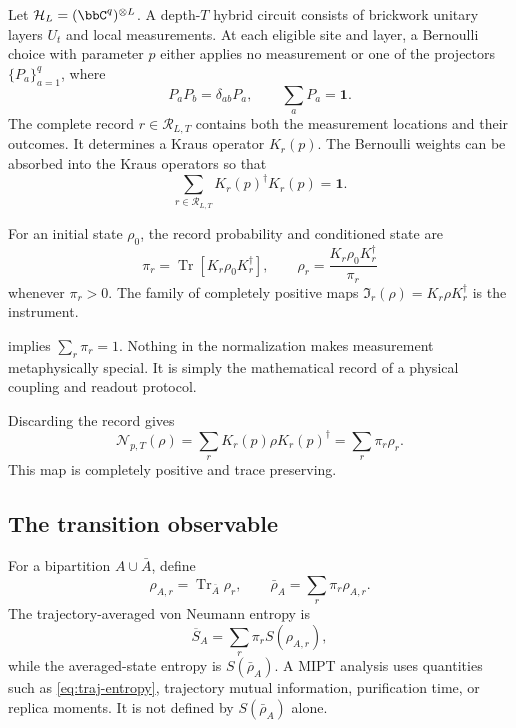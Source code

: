 \documentclass[11pt]{article}
\DeclareMathOperator{\Tr}{Tr}
\newcommand{\Inst}{\mathfrak I}
\newcommand{\Chan}{\mathcal N}
\newcommand{\Rec}{\mathcal R}
\newcommand{\Hilb}{\mathcal H}
\newcommand{\id}{\mathbf 1}
\begin{document}
Let $\Hilb_L=(\bbC^q)^{\otimes L}$.  A depth-$T$ hybrid
circuit consists of brickwork unitary layers $U_t$ and local
measurements.  At each eligible site and layer, a Bernoulli choice with
parameter $p$ either applies no measurement or one of the projectors
$\{P_a\}_{a=1}^q$, where
\[
 P_aP_b=\delta_{ab}P_a,\qquad \sum_aP_a=\id .
\]
The complete record $r\in\Rec_{L,T}$ contains both the measurement
locations and their outcomes.  It determines a Kraus operator $K_r(p)$.
The Bernoulli weights can be absorbed into the Kraus operators so that
\begin{equation}\label{eq:complete}
 \sum_{r\in\Rec_{L,T}}K_r(p)^\dagger K_r(p)=\id .
\end{equation}

\begin{definition}\label{def:instrument}
For an initial state $\rho_0$, the record probability and conditioned
state are
\begin{equation}\label{eq:trajectory}
 \pi_r=\Tr[K_r\rho_0K_r^\dagger],\qquad
 \rho_r=\frac{K_r\rho_0K_r^\dagger}{\pi_r}
\end{equation}
whenever $\pi_r>0$.  The family of completely positive maps
$\Inst_r(\rho)=K_r\rho K_r^\dagger$ is the instrument.
\end{definition}

 implies $\sum_r\pi_r=1$.  Nothing in the
normalization makes measurement metaphysically special.  It is simply
the mathematical record of a physical coupling and readout protocol.

\begin{definition}\label{def:channel}
Discarding the record gives
\begin{equation}\label{eq:channel}
 \Chan_{p,T}(\rho)=\sum_rK_r(p)\rho K_r(p)^\dagger
 =\sum_r\pi_r\rho_r .
\end{equation}
This map is completely positive and trace preserving.
\end{definition}

\subsection{The transition observable}

For a bipartition $A\cup\bar A$, define
\[
 \rho_{A,r}=\Tr_{\bar A}\rho_r,\qquad
 \bar\rho_A=\sum_r\pi_r\rho_{A,r}.
\]
The trajectory-averaged von Neumann entropy is
\begin{equation}\label{eq:traj-entropy}
 \overline S_A=\sum_r\pi_r S(\rho_{A,r}),
\end{equation}
while the averaged-state entropy is $S(\bar\rho_A)$.  A MIPT analysis
uses quantities such as \cref{eq:traj-entropy}, trajectory mutual
information, purification time, or replica moments.  It is not defined
by $S(\bar\rho_A)$ alone.
\end{document}
